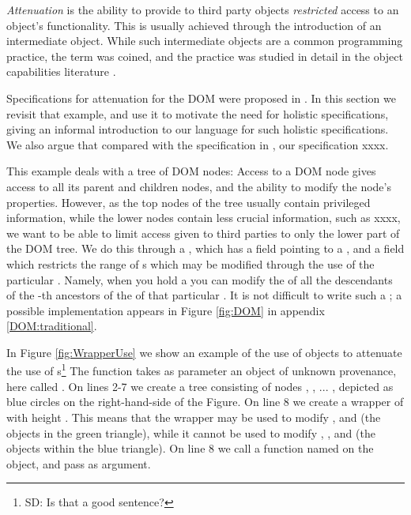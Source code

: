 \emph{Attenuation} is the ability to provide to third party objects \emph{restricted}  access to an object's functionality. This is usually achieved through the introduction of an intermediate object. While such intermediate objects are a common programming practice, 
the term was coined, and the practice  was studied in detail in the object capabilities literature \cite{millerPhD}. 

Specifications for attenuation for the DOM were proposed in \cite{dd}. 
In this section we revisit that example, and use it to motivate the need for holistic specifications, giving an informal introduction
to  our language for such holistic specifications. We also argue that compared with the specification in \cite{dd}, our specification xxxx.

This example deals with a tree of DOM nodes: Access to a DOM node gives access to all its parent and children nodes, and the ability to modify the node's properties. However, as the top nodes of the tree usually contain privileged information, while the lower nodes contain less crucial information, such as xxxx, we want to be able to limit  access given to third parties to only the lower part of the DOM tree. We do this through a , which has a field  pointing to a , and a field  which restricts the range of s which may be modified through the use of the particular . Namely, when you hold a   you can modify the  of all the descendants of the    -th ancestors of the  of that particular .  It is not difficult to write such a ; a possible implementation  appears in Figure \ref{fig:DOM} in appendix \ref{DOM:traditional}.


In Figure \ref{fig:WrapperUse} we show an example of the use of   objects to attenuate the use of s\footnote{SD: Is that a good sentence?}  The function  takes as parameter an object of unknown provenance, here called . On lines 2-7 we create  a tree consisting of nodes , , ... , depicted as blue circles on the   right-hand-side of the Figure. On line 8 we create a wrapper of  with height . This means that the wrapper  may be used to modify ,  and  (\ie the objects in the green triangle), while it cannot be used to modify , , and  (\ie the objects within the blue triangle). 
On line 8 we call a  function named  on the  object, and pass  as   argument. 

